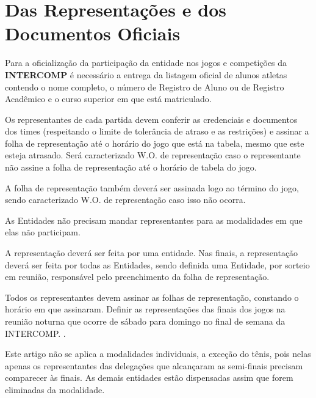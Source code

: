 
{\let\clearpage\relax \chapter{Das Representações e dos Documentos Oficiais}}

\begin{article}
	Para a oficialização da participação da entidade nos jogos e competições da \textbf{INTERCOMP} é necessário a entrega da listagem oficial de alunos atletas contendo o nome completo, o número de Registro de Aluno ou de Registro Acadêmico e o curso superior em que está matriculado.
\end{article}

\begin{article}
	Os representantes de cada partida devem conferir as credenciais e documentos dos times (respeitando o limite de tolerância de atraso e as restrições) e assinar a folha de representação até o horário do jogo que está na tabela, mesmo que este esteja atrasado. Será caracterizado W.O. de representação caso o representante não assine a folha de representação até o horário de tabela do jogo.

	\begin{xparagraph}
		A folha de representação também deverá ser assinada logo ao término do jogo, sendo caracterizado W.O. de representação caso isso não ocorra.
	\end{xparagraph}

	\begin{xparagraph}
		As Entidades não precisam mandar representantes para as modalidades em que elas não participam.
	\end{xparagraph}
\end{article}

\begin{article}
	A representação deverá ser feita por uma entidade. Nas finais, a representação deverá ser feita por todas as Entidades, sendo definida uma Entidade, por sorteio em reunião, responsável pelo preenchimento da folha de representação.

	\begin{xparagraph}
		Todos os representantes devem assinar as folhas de representação, constando o horário em que assinaram. Definir as representações das finais dos jogos na reunião noturna que ocorre de sábado para domingo no final de semana da INTERCOMP.
.
	\end{xparagraph}

	\begin{xparagraph}
		Este artigo não se aplica a modalidades individuais, a exceção do tênis, pois nelas apenas os representantes das delegações que alcançaram as semi-finais precisam comparecer às finais. As demais entidades estão dispensadas assim que forem eliminadas da modalidade.
	\end{xparagraph}
\end{article}

